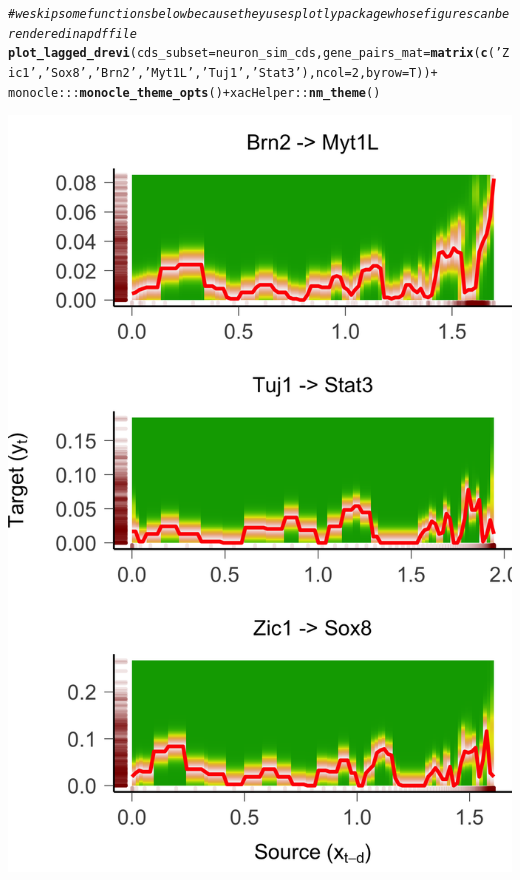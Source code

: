 \documentclass[10pt,oneside]{article}\usepackage[]{graphicx}\usepackage[]{color}
\makeatletter
\def\maxwidth{ %
  \ifdim\Gin@nat@width>\linewidth
    \linewidth
  \else
    \Gin@nat@width
  \fi
}
\newcommand{\hlnum}[1]{\textcolor[rgb]{0.686,0.059,0.569}{#1}}%
\newcommand{\hlstr}[1]{\textcolor[rgb]{0.192,0.494,0.8}{#1}}%
\newcommand{\hlcom}[1]{\textcolor[rgb]{0.678,0.584,0.686}{\textit{#1}}}%
\newcommand{\hlopt}[1]{\textcolor[rgb]{0,0,0}{#1}}%
\newcommand{\hlstd}[1]{\textcolor[rgb]{0.345,0.345,0.345}{#1}}%
\newcommand{\hlkwc}[1]{\textcolor[rgb]{0.333,0.667,0.333}{#1}}%
\newcommand{\hlkwd}[1]{\textcolor[rgb]{0.737,0.353,0.396}{\textbf{#1}}}%
\newenvironment{kframe}{%
 \def\at@end@of@kframe{}%
 \ifinner\ifhmode%
  \def\at@end@of@kframe{\end{minipage}}%
  \begin{minipage}{\columnwidth}%
 \fi\fi%
 \def\FrameCommand##1{\hskip\@totalleftmargin \hskip-\fboxsep
 \colorbox{shadecolor}{##1}\hskip-\fboxsep
     \hskip-\linewidth \hskip-\@totalleftmargin \hskip\columnwidth}%
 \MakeFramed {\advance\hsize-\width
   \@totalleftmargin\z@ \linewidth\hsize
   \@setminipage}}%
 {\par\unskip\endMakeFramed%
 \at@end@of@kframe}
\newenvironment{knitrout}{}{} %
\makeatother
\begin{document}
\begin{knitrout}
\color{fgcolor}\begin{kframe}
\begin{alltt}
\hlcom{# we skip some functions below because they uses plotly package whose figures can be rendered in a pdf file }
\hlkwd{plot_lagged_drevi}\hlstd{(}\hlkwc{cds_subset} \hlstd{= neuron_sim_cds,} \hlkwc{gene_pairs_mat} \hlstd{=} \hlkwd{matrix}\hlstd{(}\hlkwd{c}\hlstd{(}\hlstr{'Zic1'}\hlstd{,} \hlstr{'Sox8'}\hlstd{,} \hlstr{'Brn2'}\hlstd{,} \hlstr{'Myt1L'}\hlstd{,} \hlstr{'Tuj1'}\hlstd{,} \hlstr{'Stat3'}\hlstd{),} \hlkwc{ncol} \hlstd{=} \hlnum{2}\hlstd{,} \hlkwc{byrow} \hlstd{= T))} \hlopt{+}
  \hlstd{monocle}\hlopt{:::}\hlkwd{monocle_theme_opts}\hlstd{()} \hlopt{+} \hlstd{xacHelper}\hlopt{::}\hlkwd{nm_theme}\hlstd{()}
\end{alltt}
\end{kframe}

{\centering \includegraphics[width=\maxwidth]{figure/gene_pairwise_plot-1} 

}
\end{knitrout}
\end{document}
